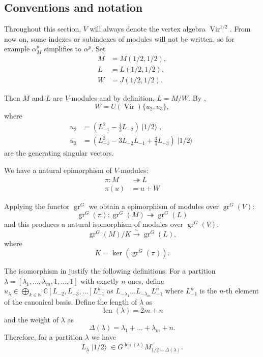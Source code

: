 \documentclass[a4paper, 12pt, reqno]{amsart}
\theoremstyle{remark}
\numberwithin{equation}{subsection}
\DeclareMathOperator{\Vir}{Vir}
\DeclareMathOperator{\gr}{gr}
\DeclareMathOperator{\len}{len}
\DeclareMathOperator{\vachalf}{|1/2\rangle}
\begin{document}
\subsection{Conventions and notation}
\label{sec:conventions-notation}

Throughout this section, $V$ will always denote the vertex algebra $\Vir^{1/2}$.
From now on, some indexes or subindexes of modules will not be written, so for example $\alpha^p_M$ simplifies to $\alpha^p$.
Set
\begin{align*}
  M &= M(1/2, 1/2), \\
  L &= L(1/2, 1/2), \\
  W &= J(1/2, 1/2).
\end{align*}

Then $M$ and $L$ are $V$-modules and by definition, $L = M/W$.
By ,
\begin{equation}
  \label{eq:53}
  W = U(\Vir)\{u_2, u_3\},
\end{equation}
where
\begin{align*}
  u_2 &= (L_{-1}^2 - \tfrac{4}{3}L_{-2})\vachalf, \\
  u_3 &= (L_{-1}^3 - 3L_{-2}L_{-1} + \tfrac{3}{4}L_{-3})\vachalf
\end{align*}
are the generating singular vectors.

We have a natural epimorphism of $V$-modules:
\begin{align*}
  \pi: M &\twoheadrightarrow L \\
  \pi(u) &= u + W
\end{align*}

Applying the functor $\gr^G$ we obtain a epimorphism of modules over $\gr^G(V)$:
\begin{equation*}
  \gr^G(\pi): \gr^G(M) \twoheadrightarrow \gr^G(L)
\end{equation*}
and this produces a natural isomorphism of modules over $\gr^G(V)$:
\begin{equation*}
  \gr^G(M)/K \xrightarrow{\sim} \gr^G(L),
\end{equation*}
where
\begin{equation}
  \label{eq:54}
  K = \ker(\gr^G(\pi)).
\end{equation}

The isomorphism in  justify the following definitions.
For a partition $\lambda = [\lambda_1, \dots, \lambda_m, 1, \dots, 1]$ with exactly $n$ ones, define $u_\lambda \in \bigoplus_{k \in \mathbb{N}}\mathbb{C}[L_{-2}, L_{-3}, \dots]L_{-1}^k$ as $L_{-\lambda_1}\dots L_{-\lambda_m}L_{-1}^n$ where $L_{-1}^n$ is the $n$-th element of the canonical basis.
Define the length of $\lambda$ as
\begin{equation*}
  \len(\lambda) = 2m + n
\end{equation*}
and the weight of $\lambda$ as
\begin{equation*}
  \Delta(\lambda) = \lambda_1 + \dots + \lambda_m + n.
\end{equation*}
Therefore, for a partition $\lambda$ we have
\begin{equation*}
  L_{\lambda}\vachalf \in G^{\len(\lambda)}M_{1/2 + \Delta(\lambda)}.
\end{equation*}
\end{document}
